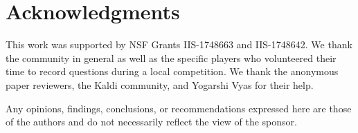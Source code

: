 \section{Acknowledgments}
\label{sec:ack}

This work was supported by NSF Grants IIS-1748663 and IIS-1748642.  We thank the \qb{} community in general as well as the specific players who volunteered their time to record questions during a local competition.  We thank the anonymous paper reviewers, the Kaldi community, and Yogarshi Vyas for their help.    

Any opinions, findings, conclusions, or recommendations expressed here are those of the authors and do not necessarily reflect the view of the sponsor.

